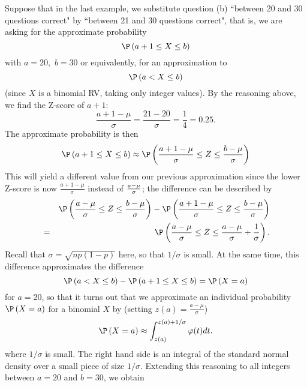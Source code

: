 Suppose that in the last example, we substitute question (b) ``between 20
and 30 questions correct" by ``between 21 and 30 questions correct", that
is, we are asking for the approximate probability%
\begin{equation*}
\P \left( a+1\leq X\leq b\right)
\end{equation*}%
with $a=20,$ $b=30$ or equivalently, for an approximation to 
\begin{equation*}
\P \left( a<X\leq b\right)
\end{equation*}%
(since $X$ is a binomial RV, taking only integer values). By the reasoning
above, we find the Z-score of $a+1$:%
\begin{equation*}
\frac{a+1-\mu }{\sigma }=\frac{21-20}{\sigma }=\frac{1}{4}=0.25.
\end{equation*}%
The approximate probability is then 
\begin{equation*}
\P \left( a+1\leq X\leq b\right) \approx \P \left( \frac{a+1-\mu }{\sigma }%
\leq Z\leq \frac{b-\mu }{\sigma }\right)
\end{equation*}
This will yield a different value from our previous approximation since the
lower Z-score is now $\frac{a+1-\mu }{\sigma }$ instead of $\frac{a-\mu }{%
\sigma }$; the difference can be described by 
\begin{eqnarray*}
&&\P \left( \frac{a-\mu }{\sigma }\leq Z\leq \frac{b-\mu }{\sigma }\right)
-\P \left( \frac{a+1-\mu }{\sigma }\leq Z\leq \frac{b-\mu }{\sigma }\right)
\\
&=&\P \left( \frac{a-\mu }{\sigma }\leq Z\leq \frac{a-\mu }{\sigma }+\frac{1%
}{\sigma }\right) .
\end{eqnarray*}%
Recall that $\sigma =\sqrt{np(1-p)}$ here, so that $1/\sigma $ is small. At
the same time, this difference approximates the difference 
\begin{equation*}
\P \left( a<X\leq b\right) -\P \left( a+1\leq X\leq b\right) =\P \left(
X=a\right)
\end{equation*}%
for $a=20$, so that it turns out that we approximate an individual
probability $\P \left( X=a\right) $ for a binomial $X$ by (setting $z(a)=%
\frac{a-\mu }{\sigma }$) 
\begin{equation}
\P \left( X=a\right) \approx \int_{z(a)}^{z(a)+1/\sigma }\varphi (t)dt.
\label{indiv-probab-approx}
\end{equation}%
where $1/\sigma $ is small. The right hand side is an integral of the
standard normal density over a small piece of size $1/\sigma .$ Extending
this reasoning to all integers between $a=20$ and $b=30$, we obtain 
